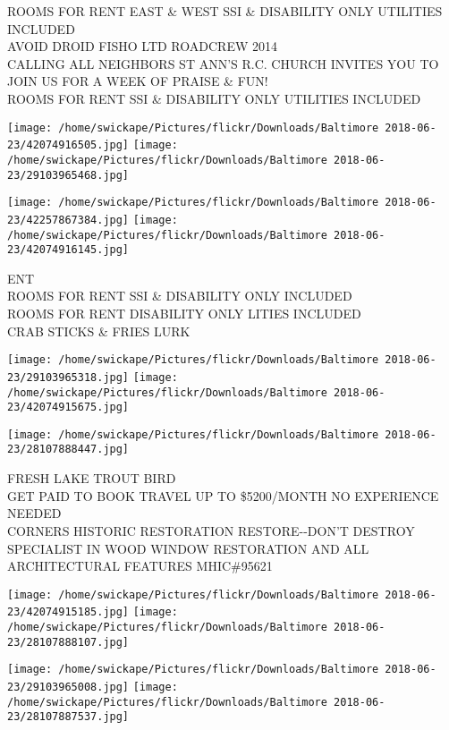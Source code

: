 \documentclass[10pt,letterpaper]{article}
\begin{document}
ROOMS FOR RENT EAST \& WEST SSI \& DISABILITY ONLY UTILITIES INCLUDED\\
AVOID DROID FISHO LTD ROADCREW 2014\\
CALLING ALL NEIGHBORS ST ANN'S R.C. CHURCH INVITES YOU TO JOIN US FOR A WEEK OF PRAISE \& FUN!\\
ROOMS FOR RENT SSI \& DISABILITY ONLY UTILITIES INCLUDED
\pagebreak

\texttt{[image: /home/swickape/Pictures/flickr/Downloads/Baltimore 2018-06-23/42074916505.jpg]}
\texttt{[image: /home/swickape/Pictures/flickr/Downloads/Baltimore 2018-06-23/29103965468.jpg]}

\texttt{[image: /home/swickape/Pictures/flickr/Downloads/Baltimore 2018-06-23/42257867384.jpg]}
\texttt{[image: /home/swickape/Pictures/flickr/Downloads/Baltimore 2018-06-23/42074916145.jpg]}

ENT\\
ROOMS FOR RENT SSI \& DISABILITY ONLY INCLUDED\\
ROOMS FOR RENT DISABILITY ONLY LITIES INCLUDED\\
CRAB STICKS \& FRIES LURK
\pagebreak

\texttt{[image: /home/swickape/Pictures/flickr/Downloads/Baltimore 2018-06-23/29103965318.jpg]}
\texttt{[image: /home/swickape/Pictures/flickr/Downloads/Baltimore 2018-06-23/42074915675.jpg]}

\vspace{0.25in}
\texttt{[image: /home/swickape/Pictures/flickr/Downloads/Baltimore 2018-06-23/28107888447.jpg]}

FRESH LAKE TROUT BIRD\\
GET PAID TO BOOK TRAVEL UP TO \$5200/MONTH NO EXPERIENCE NEEDED\\
CORNERS HISTORIC RESTORATION RESTORE{-}{-}DON'T DESTROY SPECIALIST IN WOOD WINDOW RESTORATION AND ALL ARCHITECTURAL FEATURES MHIC\#95621
\pagebreak

\texttt{[image: /home/swickape/Pictures/flickr/Downloads/Baltimore 2018-06-23/42074915185.jpg]}
\texttt{[image: /home/swickape/Pictures/flickr/Downloads/Baltimore 2018-06-23/28107888107.jpg]}

\texttt{[image: /home/swickape/Pictures/flickr/Downloads/Baltimore 2018-06-23/29103965008.jpg]}
\texttt{[image: /home/swickape/Pictures/flickr/Downloads/Baltimore 2018-06-23/28107887537.jpg]}
\end{document}
